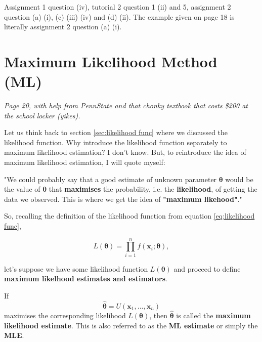 \begin{exercise}
    Assignment 1 question (iv), tutorial 2 question 1 (ii) and 5, assignment 2 question (a) (i), (c) (iii) (iv) and (d) (ii). 
    The example given on page 18 is literally assignment 2 question (a) (i). 
\end{exercise}

\section{Maximum Likelihood Method (ML)}\label{sec:ML method}

\textit{Page 20, with help from PennState and that chonky textbook that costs \$200 at the school locker (yikes). \autocite{penn415} \autocite{rice}}

Let us think back to section \ref{sec:likelihood func} where we discussed the likelihood function. 
Why introduce the likelihood function separately to maximum likelihood estimation? 
I don't know. But, to reintroduce the idea of maximum likelihood estimation, I will quote myself:

\bigskip

"We could probably say that a good estimate of unknown parameter \(\bm{\theta}\) would be the value of \(\bm{\theta}\) that \textbf{maximises} the probability, i.e. the \textbf{likelihood}, of getting the data we observed. 
This is where we get the idea of \textbf{"maximum likehood"}." 

\bigskip

So, recalling the definition of the likelihood function from equation \ref{eq:likelihood func}, 

\begin{equation*}
    L(\bm{\theta}) = \prod_{i=1}^n f(\bm{x}_i;\bm{\theta}),
\end{equation*}

let's suppose we have some likelihood function \(L(\bm{\theta})\) and proceed to define \textbf{maximum likelhood estimates and estimators}. 

\begin{definition}\label{defn:ml estimate}
    If 
    \begin{equation}\label{eq:ml estimate}
        \hat{\bm{\theta}} = U(\bm{x}_1,...,\bm{x}_n)
    \end{equation}
    maximises the corresponding likelihood \(L(\bm{\theta})\), then \(\hat{\bm{\theta}}\) is called the \textbf{maximum likelihood estimate}.
    This is also referred to as the \textbf{ML estimate} or simply the \textbf{MLE}.
\end{definition}

